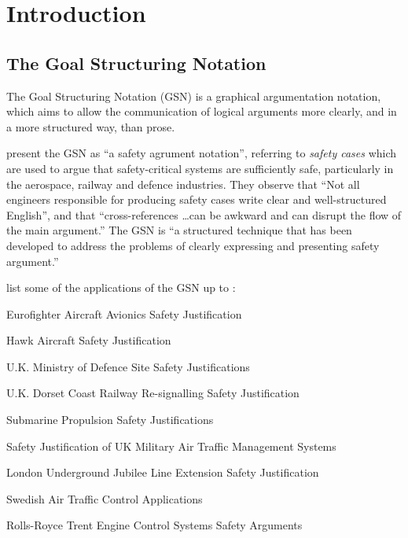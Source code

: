 \chapter{Introduction}




\section{The Goal Structuring Notation}

The Goal Structuring Notation (GSN) is a graphical argumentation notation,
which aims to allow the communication of logical arguments more clearly, and in a more structured way, than prose.

\citet{kelly2004goal} present the GSN as ``a safety agrument notation'',
referring to \emph{safety cases} which are used to argue that safety-critical systems are sufficiently safe,
particularly in the aerospace, railway and defence industries.
They observe that
``Not all engineers responsible for producing safety cases write clear and
well-structured English'',
and that
``cross-references \ldots can be awkward and can disrupt the flow of the main argument.'' 
The GSN is ``a structured technique that has been developed to address the
problems of clearly expressing and presenting safety argument.''

\citet{Habli:2006:PPC:1183088.1183090} list some of the applications of the GSN up to \citeyear{Habli:2006:PPC:1183088.1183090}:

\begin{itemize*}
  \item{Eurofighter Aircraft Avionics Safety Justification}
  \item{Hawk Aircraft Safety Justification}
  \item{U.K. Ministry of Defence Site Safety Justifications}
  \item{U.K. Dorset Coast Railway Re-signalling Safety Justification}
  \item{Submarine Propulsion Safety Justifications}
  \item{Safety Justification of UK Military Air Traffic Management Systems}
  \item{London Underground Jubilee Line Extension Safety Justification}
  \item{Swedish Air Traffic Control Applications}
  \item{Rolls-Royce Trent Engine Control Systems Safety Arguments}
\end{itemize*}

